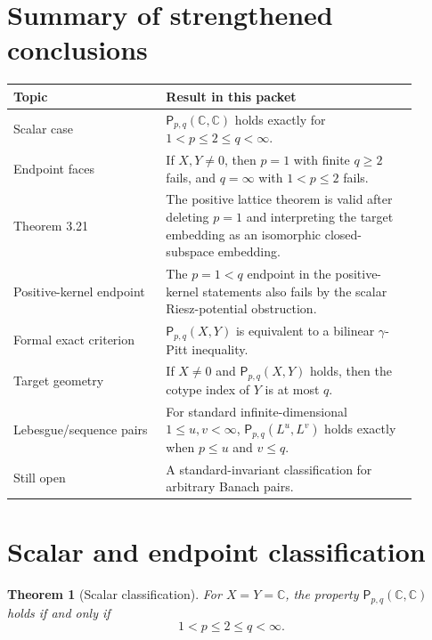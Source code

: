 \documentclass[11pt]{article}
\newtheorem{theorem}{Theorem}[section]
\newcommand{\C}{\mathbb C}
\newcommand{\Pprop}{\mathsf P}
\newcommand{\gam}{\gamma}
\begin{document}
\section{Summary of strengthened conclusions}

\begin{center}
\begin{tabular}{@{}p{0.34\linewidth}p{0.56\linewidth}@{}}
\toprule
Topic & Result in this packet\\
\midrule
Scalar case & \(\Pprop_{p,q}(\C,\C)\) holds exactly for
\(1<p\le2\le q<\infty\).\\
Endpoint faces & If \(X,Y\ne0\), then \(p=1\) with finite \(q\ge2\) fails, and
\(q=\infty\) with \(1<p\le2\) fails.\\
Theorem 3.21 & The positive lattice theorem is valid after deleting \(p=1\)
and interpreting the target embedding as an isomorphic closed-subspace
embedding.\\
Positive-kernel endpoint & The \(p=1<q\) endpoint in the positive-kernel
statements also fails by the scalar Riesz-potential obstruction.\\
Formal exact criterion & \(\Pprop_{p,q}(X,Y)\) is equivalent to a bilinear
\(\gam\)-Pitt inequality.\\
Target geometry & If \(X\ne0\) and \(\Pprop_{p,q}(X,Y)\) holds, then the cotype
index of \(Y\) is at most \(q\).\\
Lebesgue/sequence pairs & For standard infinite-dimensional
\(1\le u,v<\infty\), \(\Pprop_{p,q}(L^u,L^v)\) holds exactly when
\(p\le u\) and \(v\le q\).\\
Still open & A standard-invariant classification for arbitrary Banach pairs.\\
\bottomrule
\end{tabular}
\end{center}

\section{Scalar and endpoint classification}

\begin{theorem}[Scalar classification]\label{thm:scalar}
For \(X=Y=\C\), the property \(\Pprop_{p,q}(\C,\C)\) holds if and only if
\[
  1<p\le2\le q<\infty.
\]
\end{theorem}
\end{document}
